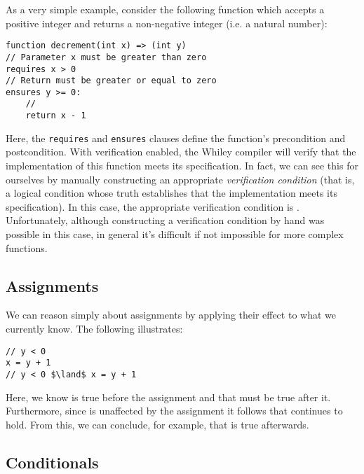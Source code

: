 As a very simple example, consider the following function which accepts a positive integer and returns a
non-negative integer (i.e. a natural number):
\begin{tcolorbox}\begin{lstlisting}[language=Whiley]
function decrement(int x) => (int y) 
// Parameter x must be greater than zero
requires x > 0
// Return must be greater or equal to zero
ensures y >= 0:
    //
    return x - 1
\end{lstlisting}\end{tcolorbox}
Here, the \lstinline{requires} and \lstinline{ensures} clauses define the function's precondition and postcondition.  With verification enabled, the Whiley compiler will verify that the implementation of this function meets its specification.  In fact, we can see this for ourselves by manually constructing an appropriate {\em verification condition} (that is, a logical condition whose truth establishes that the implementation meets its specification).  In this case, the appropriate verification condition is .  Unfortunately, although constructing a verification condition by hand was possible in this case, in general it's difficult if not impossible for more complex functions.

\subsection{Assignments}

We can reason simply about assignments by applying their effect to what we currently know.  The following illustrates:

\begin{tcolorbox}\begin{lstlisting}[language=Whiley]
// y < 0 
x = y + 1
// y < 0 $\land$ x = y + 1
\end{lstlisting}\end{tcolorbox}

Here, we know  is true before the assignment and that  must be true after it.  Furthermore, since  is unaffected by the assignment it follows that  continues to hold.  From this, we can conclude, for example, that  is true afterwards.  

\subsection{Conditionals}

